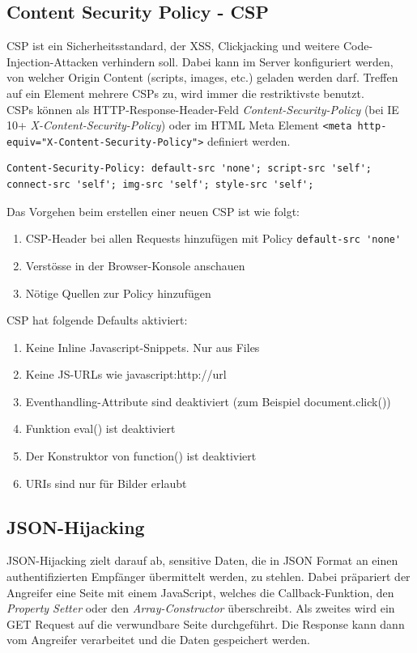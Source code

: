 \subsection{Content Security Policy - CSP}
CSP ist ein Sicherheitsstandard, der XSS, Clickjacking und weitere Code-Injection-Attacken verhindern soll. Dabei kann im Server konfiguriert werden, von welcher Origin Content (scripts, images, etc.) geladen werden darf. Treffen auf ein Element mehrere CSPs zu, wird immer die restriktivste benutzt.\\
CSPs können als HTTP-Response-Header-Feld \textit{Content-Security-Policy} (bei IE 10+ \textit{X-Content-Security-Policy}) oder im HTML Meta Element \lstinline|<meta http-equiv="X-Content-Security-Policy">| definiert werden.

\begin{lstlisting}[caption=Starter Policy für CSP-Header, language={}]
Content-Security-Policy: default-src 'none'; script-src 'self'; connect-src 'self'; img-src 'self'; style-src 'self';
\end{lstlisting}

Das Vorgehen beim erstellen einer neuen CSP ist wie folgt:
\begin{enumerate}
	\item CSP-Header bei allen Requests hinzufügen mit Policy \lstinline[language=clean]|default-src 'none'|
	\item Verstösse in der Browser-Konsole anschauen
	\item Nötige Quellen zur Policy hinzufügen
\end{enumerate}

CSP hat folgende Defaults aktiviert:
\begin{enumerate}
	\item Keine Inline Javascript-Snippets. Nur aus Files 
	\item Keine JS-URLs wie javascript:http://url
	\item Eventhandling-Attribute sind deaktiviert (zum Beispiel document.click())
	\item Funktion eval() ist deaktiviert
	\item Der Konstruktor von function() ist deaktiviert
	\item URIs sind nur für Bilder erlaubt
\end{enumerate}

\subsection{JSON-Hijacking}
JSON-Hijacking zielt darauf ab, sensitive Daten, die in JSON Format an einen authentifizierten Empfänger übermittelt werden, zu stehlen. Dabei präpariert der Angreifer eine Seite mit einem JavaScript, welches die Callback-Funktion, den \textit{Property Setter} oder den \textit{Array-Constructor} überschreibt. Als zweites wird ein GET Request auf die verwundbare Seite durchgeführt. Die Response kann dann vom Angreifer verarbeitet und die Daten gespeichert werden.\\

